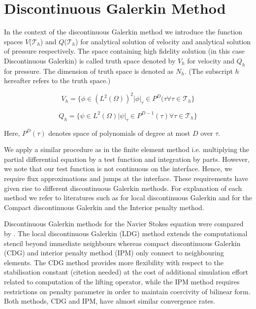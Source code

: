 \documentclass[a4paper,12pt]{book}
\begin{document}
\newpage
\newpage


\section{Discontinuous Galerkin Method}

In the context of the discontinuous Galerkin method we introduce the function spaces $V$($\mathcal{T}_h$) and $Q$($\mathcal{T}_h$) for analytical solution of velocity and analytical solution of pressure respectively. The space containing high fidelity solution (in this case Discontinuous Galerkin) is called truth space denoted by $V_h$ for velocity and $Q_h$ for pressure. The dimension of truth space is denoted as $N_h$. (The subscript $h$ hereafter refers to the truth space.)

\begin{equation} \label{velocity_test}
V_h = \lbrace \phi \in (L^2(\Omega))^2| \phi |_\tau \in P^D(\tau \forall \tau \in \mathcal{T}_h \rbrace
\end{equation}

\begin{equation} \label{pressure_test}
Q_h = \lbrace \psi \in L^2(\Omega)| \psi |_\tau \in P^{D-1}(\tau) \forall \tau \in \mathcal{T}_h \rbrace
\end{equation}

Here, $P^D(\tau)$ denotes space of polynomials of degree at most $D$ over $\tau$.

We apply a similar procedure as in the finite element method i.e. multiplying the partial differential equation by a test function and integration by parts. However, we note that our test function is not continuous on the interface. Hence, we require flux approximations and jumps at the interface. These requirements have given rise to different discontinuous Galerkin methods. For explanation of each method we refer to literatures such as \cite{persson} for local discontinuous Galerkin and \cite{Montlaur} for the Compact discontinuous Galerkin and the Interior penalty method. 

Discontinuous Galerkin methods for the Navier Stokes equation were compared by \cite{Montlaur}. The local discontinuous Galerkin (LDG) method extends the computational stencil beyond immediate neighbours whereas compact discontinuous Galerkin (CDG) and interior penalty method (IPM) only connect to neighbouring elements. The CDG method provides more flexibility with respect to the stabilisation constant (citetion needed) at the cost of additional simulation effort related to computation of the lifting operator, while the IPM method requires restrictions on penalty parameter in order to maintain coercivity of bilinear form. Both methods, CDG and IPM, have almost similar convergence rates. 
\end{document}
